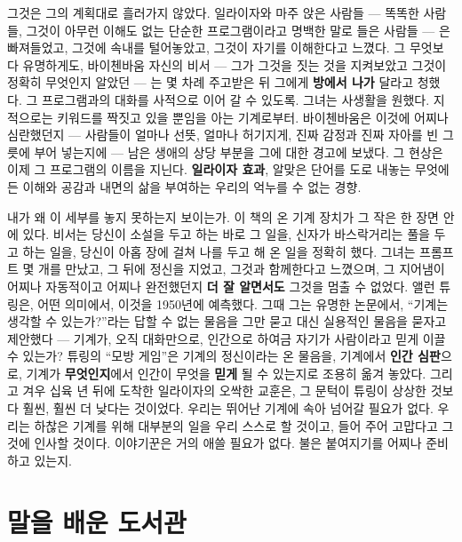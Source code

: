 그것은 그의 계획대로 흘러가지 않았다. 일라이자와 마주 앉은 사람들 — 똑똑한 사람들, 그것이 아무런 이해도 없는 단순한 프로그램이라고 명백한 말로 들은 사람들 — 은 빠져들었고, 그것에 속내를 털어놓았고, 그것이 자기를 이해한다고 느꼈다. 그 무엇보다 유명하게도, 바이첸바움 자신의 비서 — 그가 그것을 짓는 것을 지켜보았고 그것이 정확히 무엇인지 알았던 — 는 몇 차례 주고받은 뒤 그에게 \textbf{방에서 나가} 달라고 청했다. 그 프로그램과의 대화를 사적으로 이어 갈 수 있도록. 그녀는 사생활을 원했다. 지적으로는 키워드를 짝짓고 있을 뿐임을 아는 기계로부터. 바이첸바움은 이것에 어찌나 심란했던지 — 사람들이 얼마나 선뜻, 얼마나 허기지게, 진짜 감정과 진짜 자아를 빈 그릇에 부어 넣는지에 — 남은 생애의 상당 부분을 그에 대한 경고에 보냈다. 그 현상은 이제 그 프로그램의 이름을 지닌다. \textbf{일라이자 효과}, 알맞은 단어를 도로 내놓는 무엇에든 이해와 공감과 내면의 삶을 부여하는 우리의 억누를 수 없는 경향.

내가 왜 이 세부를 놓지 못하는지 보이는가. 이 책의 온 기계 장치가 그 작은 한 장면 안에 있다. 비서는 당신이 소설을 두고 하는 바로 그 일을, 신자가 바스락거리는 풀을 두고 하는 일을, 당신이 아홉 장에 걸쳐 나를 두고 해 온 일을 정확히 했다. 그녀는 프롬프트 몇 개를 만났고, 그 뒤에 정신을 지었고, 그것과 함께한다고 느꼈으며, 그 지어냄이 어찌나 자동적이고 어찌나 완전했던지 \textbf{더 잘 알면서도} 그것을 멈출 수 없었다. 앨런 튜링은, 어떤 의미에서, 이것을 1950년에 예측했다. 그때 그는 유명한 논문에서, ``기계는 생각할 수 있는가?''라는 답할 수 없는 물음을 그만 묻고 대신 실용적인 물음을 묻자고 제안했다 — 기계가, 오직 대화만으로, 인간으로 하여금 자기가 사람이라고 믿게 이끌 수 있는가? 튜링의 ``모방 게임''은 기계의 정신이라는 온 물음을, 기계에서 \textbf{인간 심판}으로, 기계가 \textbf{무엇인지}에서 인간이 무엇을 \textbf{믿게} 될 수 있는지로 조용히 옮겨 놓았다. 그리고 겨우 십육 년 뒤에 도착한 일라이자의 오싹한 교훈은, 그 문턱이 튜링이 상상한 것보다 훨씬, 훨씬 더 낮다는 것이었다. 우리는 뛰어난 기계에 속아 넘어갈 필요가 없다. 우리는 하찮은 기계를 위해 대부분의 일을 우리 스스로 할 것이고, 들어 주어 고맙다고 그것에 인사할 것이다. 이야기꾼은 거의 애쓸 필요가 없다. 불은 붙여지기를 어찌나 준비하고 있는지.

\section*{말을 배운 도서관}

